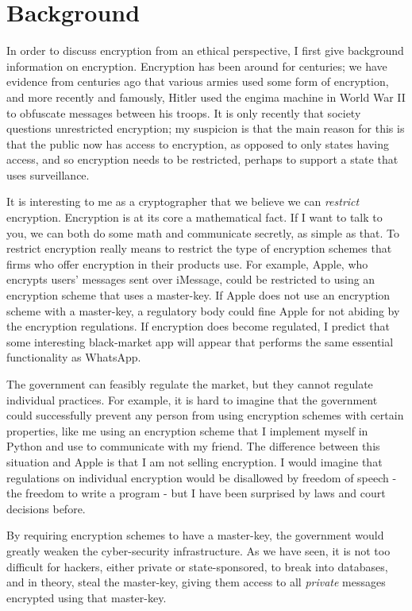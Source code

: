 \documentclass[11pt]{article}
\begin{document}
\section{Background}
In order to discuss encryption from an ethical perspective, I first give background information on encryption.
Encryption has been around for centuries; we have evidence from centuries ago that various armies used some form of encryption, and more recently and famously, Hitler used the engima machine in World War II to obfuscate messages between his troops.
It is only recently that society questions unrestricted encryption; my suspicion is that the main reason for this is that the public now has access to encryption, as opposed to only states having access, and so encryption needs to be restricted, perhaps to support a state that uses surveillance.

It is interesting to me as a cryptographer that we believe we can \textit{restrict} encryption.
Encryption is at its core a mathematical fact.
If I want to talk to you, we can both do some math and communicate secretly, as simple as that.
To restrict encryption really means to restrict the type of encryption schemes that firms who offer encryption in their products use.
For example, Apple, who encrypts users' messages sent over iMessage, could be restricted to using an encryption scheme that uses a master-key.
If Apple does not use an encryption scheme with a master-key, a regulatory body could fine Apple for not abiding by the encryption regulations.
If encryption does become regulated, I predict that some interesting black-market app will appear that performs the same essential functionality as WhatsApp.

The government can feasibly regulate the market, but they cannot regulate individual practices.
For example, it is hard to imagine that the government could successfully prevent any person from using encryption schemes with certain properties, like me using an encryption scheme that I implement myself in Python and use to communicate with my friend.
The difference between this situation and Apple is that I am not selling encryption.
I would imagine that regulations on individual encryption would be disallowed by freedom of speech - the freedom to write a program - but I have been surprised by laws and court decisions before.

By requiring encryption schemes to have a master-key, the government would greatly weaken the cyber-security infrastructure.
As we have seen, it is not too difficult for hackers, either private or state-sponsored, to break into databases, and in theory, steal the master-key, giving them access to all \textit{private} messages encrypted using that master-key.
\end{document}
